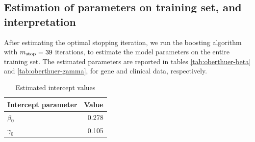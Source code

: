\subsection{Estimation of parameters on training set, and interpretation}
After estimating the optimal stopping iteration, we run the boosting algorithm with $m_{\text{stop}}=39$ iterations, to estimate the model parameters on the entire training set.
The estimated parameters are reported in tables \ref{tab:oberthuer-beta} and \ref{tab:oberthuer-gamma}, for gene and clinical data, respectively.
\begin{table}\label{tab:neuroblastoma-intercepts}
\caption{Estimated intercept values}
\begin{tabular}{l|r}
Intercept parameter & Value\\
\hline
$\beta_0$ & 0.278 \\
$\gamma_0$ & 0.105
\end{tabular}
\end{table}

